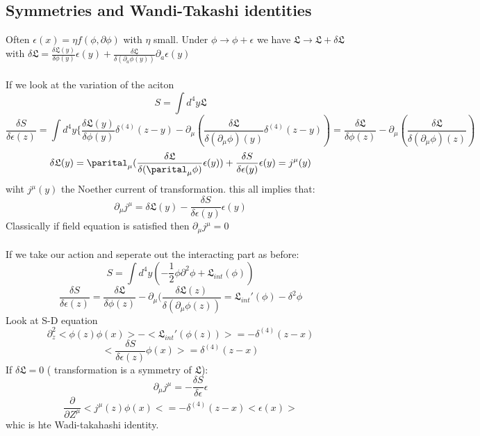 \documentclass{article}
\begin{document}
   \subsection{Symmetries and Wandi-Takashi identities}
   Often $\epsilon(x) = \eta f(\phi, \partial \phi)$ with $\eta$ small. Under $\phi \rightarrow \phi + \epsilon$ we have $\mathfrak{L} \rightarrow \mathfrak{L} + \delta \mathfrak{L}$
   with $\delta \mathfrak{L} = \frac{\delta \mathfrak{L}(y)}{\delta \phi(y)} \epsilon(y) + \frac{\delta \mathfrak{L}}{\delta ( \partial_a \phi(y))} \partial_a \epsilon (y)$\\\\
   If we look at the variation of the aciton
   $$
   S = \int d^4 y \mathfrak{L}
   $$
   $$ 
   \frac{\delta S}{\delta \epsilon(z)} = \int d^4 y \{ \frac{\delta \mathfrak{L}(y)}{\delta \phi(y)}  \delta^{(4)}(z-y) - \partial_{\mu} ( \frac{\delta \mathfrak{L}}{\delta ( \partial_{\mu} \phi) (y)} \delta^{(4)}(z-y)) = \frac{\delta \mathfrak{L}}{\delta \phi(z)} - \partial_{\mu} (\frac{\delta \mathfrak{L}}{\delta ( \partial_{\mu} \phi) (z)})
   $$
   $$
    \delta \mathfrak{L}(y) = \parital_{\mu} ( \frac{\delta \mathfrak{L}}{\delta ( \parital_{\mu} \phi)}\epsilon(y)) + \frac{\delta S}{\delta \epsilon(y)} \epsilon(y) =  j^{\mu} (y)
   $$
    wiht $j^{\mu}(y)$ the Noether current of transformation. this all implies that:
    $$
     \partial_{\mu} j^{\mu} = \delta \mathfrak{L}(y) - \frac{\delta S}{\delta \epsilon(y) }\epsilon(y)
    $$
    Classically if field equation is satisfied then $\partial_{\mu} j^{\mu} = 0$\\\\
    If we take our action and seperate out the interacting part as before:
    $$
     S= \int d^4 y ( - \frac{1}{2} \phi \partial^2 \phi + \mathfrak{L}_{int} (\phi))
    $$
    $$
     \frac{\delta S}{\delta \epsilon(z)} = \frac{\delta \mathfrak{L}}{\delta \phi(z)} - \partial_{\mu} ( \frac{\delta \mathfrak{L}(z)}{\delta ( \partial_{\mu} \phi(z))} = \mathfrak{L}_{int}'(\phi) - \delta^2 \phi
    $$
    Look at S-D equation
    $$
     \partial_z^2 < \phi(z) \phi(x) > - < \mathfrak{L}_{int}' (\phi(z))> = - \delta^{(4)} (z-x)
    $$
    $$
     < \frac{ \delta S}{\delta \epsilon(z)} \phi(x)> = \delta^{(4)} (z-x)
    $$
    If $\delta \mathfrak{L} = 0$ ( transformation is a symmetry of $\mathfrak{L}$):
    $$
    \partial_{\mu} j^{\mu} =  - \frac{\delta S}{\delta \epsilon} \epsilon 
    $$
    $$
     \frac{\partial}{\partial Z^{\mu}}< j^{\mu}(z) \phi(x) < = - \delta^{(4)} (z-x) <\epsilon(x) >
    $$
    whic is hte Wadi-takahashi identity.\\\\
\end{document}
